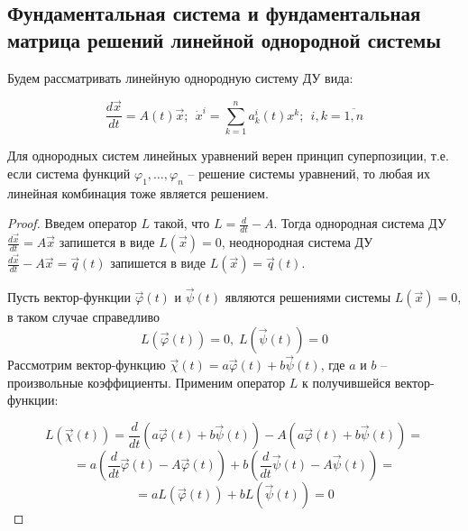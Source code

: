 \subsection{Фундаментальная система и фундаментальная матрица решений линейной однородной
системы}

Будем рассматривать линейную однородную систему ДУ вида:

\begin{equation}
    \frac{d \overrightarrow x}{dt} = A(t) \overrightarrow x; ~~ \dot x^i = \sum^n_{k = 1} a^i_k(t) x^k; ~~ i, k = \overline{1, n}
    \label{4_2_lin_syst}
\end{equation}

\begin{proposition}
    Для однородных систем линейных уравнений верен принцип суперпозиции, т.е. если
    система функций $\varphi_1, \dots, \varphi_n$ -- решение системы уравнений, то любая их линейная комбинация тоже
    является решением.
\end{proposition}
\begin{proof}

    Введем оператор $L$ такой, что $L = \frac{d}{dt} - A$. Тогда однородная система ДУ $\frac{d \overrightarrow x}{dt} = A \overrightarrow x$ запишется в виде $L(\overrightarrow x) = 0$, неоднородная система ДУ $\frac{d \overrightarrow x}{dt} - A \overrightarrow x = \overrightarrow{q}(t)$ запишется в виде $L(\overrightarrow x) = \overrightarrow{q}(t)$.

    Пусть вектор-функции $\overrightarrow{\varphi}(t)$ и $\overrightarrow{\psi}(t)$ являются решениями системы $L(\overrightarrow x) = 0$, в таком случае справедливо
    \[ L(\overrightarrow{\varphi}(t)) = 0, \; L(\overrightarrow{\psi}(t)) = 0 \]
    Рассмотрим вектор-функцию $\overrightarrow{\chi}(t) = a \overrightarrow{\varphi}(t) + b \overrightarrow{\psi}(t)$, где $a$ и $b$ --  произвольные коэффициенты. Применим оператор $L$ к получившейся вектор-функции:
    
    \[ L(\overrightarrow{\chi}(t)) = \frac{d}{dt} \left(a \overrightarrow{\varphi}(t) + b \overrightarrow{\psi}(t) \right) - A \left(a \overrightarrow{\varphi}(t) + b \overrightarrow{\psi}(t) \right) = \]
    \[ = a \left(\frac{d}{dt} \overrightarrow{\varphi}(t) - A \overrightarrow{\varphi}(t) \right) + b \left(\frac{d}{dt} \overrightarrow{\psi}(t) - A \overrightarrow{\psi}(t) \right) = \]
    \[ = a L(\overrightarrow{\varphi}(t)) + b L(\overrightarrow{\psi}(t)) = 0 \]

\end{proof}

